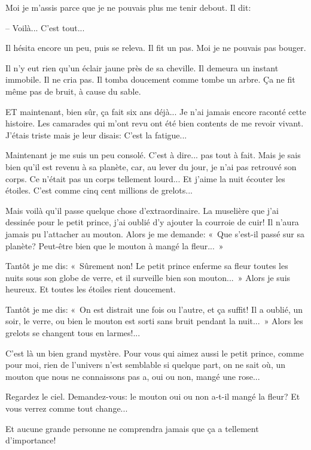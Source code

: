\documentclass[a4paper]{report}
\begin{document}
Moi je m'assis parce que je ne pouvais plus me tenir debout. Il dit:

-- Voilà... C'est tout...

Il hésita encore un peu, puis se releva. Il fit un pas. Moi je ne pouvais pas bouger.

Il n'y eut rien qu'un éclair jaune près de sa cheville. Il demeura un instant immobile. Il ne cria pas. Il tomba doucement comme tombe un arbre. Ça ne fit même pas de bruit, à cause du sable. 


\parachapter{} %

ET maintenant, bien sûr, ça fait six ans déjà... Je n'ai jamais encore raconté cette histoire. Les camarades qui m'ont revu ont été bien contents de me revoir vivant. J'étais triste mais je leur disais: C'est la fatigue...

Maintenant je me suis un peu consolé. C'est à dire... pas tout à fait. Mais je sais bien qu'il est revenu à sa planète, car, au lever du jour, je n'ai pas retrouvé son corps. Ce n'était pas un corps tellement lourd... Et j'aime la nuit écouter les étoiles. C'est comme cinq cent millions de grelots...

Mais voilà qu'il passe quelque chose d'extraordinaire. La muselière que j'ai dessinée pour le petit prince, j'ai oublié d'y ajouter la courroie de cuir! Il n'aura jamais pu l'attacher au mouton. Alors je me demande: «~Que s'est-il passé sur sa planète? Peut-être bien que le mouton à mangé la fleur...~»

Tantôt je me dis: «~Sûrement non! Le petit prince enferme sa fleur toutes les nuits sous son globe de verre, et il surveille bien son mouton...~» Alors je suis heureux. Et toutes les étoiles rient doucement.

Tantôt je me dis: «~On est distrait une fois ou l'autre, et ça suffit! Il a oublié, un soir, le verre, ou bien le mouton est sorti sans bruit pendant la nuit...~» Alors les grelots se changent tous en larmes!...

C'est là un bien grand mystère. Pour vous qui aimez aussi le petit prince, comme pour moi, rien de l'univers n'est semblable si quelque part, on ne sait où, un mouton que nous ne connaissons pas a, oui ou non, mangé une rose...

Regardez le ciel. Demandez-vous: le mouton oui ou non a-t-il mangé la fleur? Et vous verrez comme tout change...

Et aucune grande personne ne comprendra jamais que ça a tellement d'importance!
\end{document}
